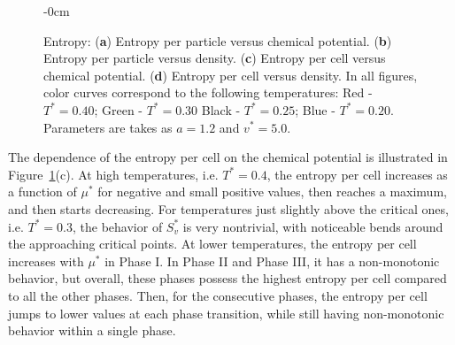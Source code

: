 \documentclass[entropy,article,submit,pdftex,moreauthors]{Definitions/mdpi}
\begin{document}
\begin{figure}[H]
\begin{adjustwidth}{-\extralength}{0cm}
		\end{adjustwidth}
	\caption{Entropy: (\textbf{a}) Entropy per particle versus chemical potential. (\textbf{b}) Entropy per particle versus density. (\textbf{c}) Entropy per cell versus chemical potential. (\textbf{d}) Entropy per cell versus density. In all figures, color curves correspond to the following temperatures: Red - $T^*=0.40$; Green - $T^*=0.30$ Black - $T^*=0.25$; Blue - $T^* = 0.20$. Parameters are takes as $a=1.2$ and $v^*=5.0$.\label{fig:entropy3}}
\end{figure} 

The dependence of the entropy per cell on the chemical potential is illustrated in Figure~\ref{fig:entropy3}(c). At high temperatures, i.e. $T^*=0.4$, the entropy per cell increases as a function of $\mu^*$ for negative and small positive values, then reaches a maximum, and then starts decreasing. For temperatures just slightly above the critical ones, i.e. $T^*=0.3$, the behavior of $S^*_v$ is very nontrivial, with noticeable bends around the approaching critical points. At lower temperatures, the entropy per cell increases with $\mu^*$ in Phase I. In Phase II and Phase III, it has a non-monotonic behavior, but overall, these phases possess the highest entropy per cell compared to all the other phases. Then, for the consecutive phases, the entropy per cell jumps to lower values at each phase transition, while still having non-monotonic behavior within a single phase. 
\end{document}
